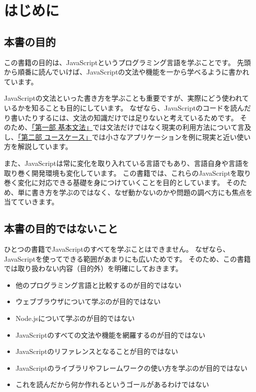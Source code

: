 \hypertarget{prolog}{%
\chapter*{はじめに}\label{prolog}}
\thispagestyle{frontheadings}

\hypertarget{do}{%
\section*{本書の目的}\label{do}}

この書籍の目的は、JavaScriptというプログラミング言語を学ぶことです。
先頭から順番に読んでいけば、JavaScriptの文法や機能を一から学べるように書かれています。

JavaScriptの文法といった書き方を学ぶことも重要ですが、実際にどう使われているかを知ることも目的にしています。
なぜなら、JavaScriptのコードを読んだり書いたりするには、文法の知識だけでは足りないと考えているためです。
そのため、\hyperlink{basic-grammar}{「第一部 基本文法」}では文法だけではなく現実の利用方法について言及し、\hyperlink{use-case}{「第二部 ユースケース」}では小さなアプリケーションを例に現実と近い使い方を解説しています。

また、JavaScriptは常に変化を取り入れている言語でもあり、言語自身や言語を取り巻く開発環境も変化しています。
この書籍では、これらのJavaScriptを取り巻く変化に対応できる基礎を身につけていくことを目的としています。
そのため、単に書き方を学ぶのではなく、なぜ動かないのかや問題の調べ方にも焦点を当てていきます。

\hypertarget{do-not}{%
\section*{本書の目的ではないこと}\label{do-not}}

ひとつの書籍でJavaScriptのすべてを学ぶことはできません。
なぜなら、JavaScriptを使ってできる範囲があまりにも広いためです。
そのため、この書籍では取り扱わない内容（目的外）を明確にしておきます。

\begin{itemize}
\item
  他のプログラミング言語と比較するのが目的ではない
\item
  ウェブブラウザについて学ぶのが目的ではない
\item
  Node.jsについて学ぶのが目的ではない
\item
  JavaScriptのすべての文法や機能を網羅するのが目的ではない
\item
  JavaScriptのリファレンスとなることが目的ではない
\item
  JavaScriptのライブラリやフレームワークの使い方を学ぶのが目的ではない
\item
  これを読んだから何か作れるというゴールがあるわけではない
\end{itemize}

